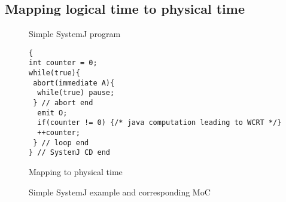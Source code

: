 \subsection{Mapping logical time to physical time}
\label{sec:mapping-logical-time}

\begin{figure}[t!]
\centering
\begin{SubFloat}{\label{fig:2a}Simple SystemJ program}%
\begin{minipage}[b]{1\linewidth}%
		\begin{lstlisting}[style=sysj,morekeywords={abort,await,emit,present,trap,pause,exit,delay,suspend}]
{
int counter = 0;
while(true){
 abort(immediate A){
  while(true) pause; 
 } // abort end
  emit O;
  if(counter != 0) {/* java computation leading to WCRT */}
  ++counter;
 } // loop end
} // SystemJ CD end
\end{lstlisting}%
\end{minipage}%
\end{SubFloat}

\begin{SubFloat}{\label{fig:2c}Mapping to physical time}%
\scalebox{0.68}{}
\end{SubFloat}%
\caption{Simple SystemJ example and corresponding MoC}
\label{fig:2}
\end{figure}

